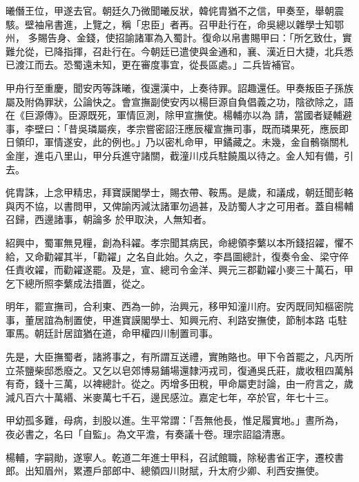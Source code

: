 \begin{pinyinscope}
 曦僭王位，甲遂去官。朝廷久乃微聞曦反狀，韓侂胄猶不之信，甲奏至，舉朝震駭。壁袖帛書進，上覽之，稱「忠臣」者再。召甲赴行在，命吳總以雜學士知鄂州，
 多賜告身、金錢，使招諭諸軍為入蜀計。復命以帛書賜甲曰：「所乞致仕，實難允從，已降指揮，召赴行在。今朝廷已遣使與金通和，襄、漢近日大捷，北兵悉已渡江而去。恐蜀遠未知，更在審度事宜，從長區處。」二兵皆補官。



 甲舟行至重慶，聞安丙等誅曦，復還漢中，上奏待罪。詔趣還任。甲奏叛臣子孫族屬及附偽罪狀，公論快之。會宣撫副使安丙以楊巨源自負倡義之功，陰欲除之，語在《巨源傳》。臣源既死，軍情叵測，除甲宣撫使。楊輔亦以為
 請，當國者疑輔避事，李壁曰：「昔吳璘屬疾，孝宗嘗密詔汪應辰權宣撫司事，既而璘果死，應辰即日領印，軍情遂安，此的例也。」乃以密札命甲，甲鐍藏之。未幾，金自鶻嶺關札金崖，進屯八里山，甲分兵進守諸關，截潼川戍兵駐饒風以待之。金人知有備，引去。



 侂胄誅，上念甲精忠，拜寶謨閣學士，賜衣帶、鞍馬。是歲，和議成，朝廷聞彭輅與丙不協，以書問甲，又俾諭丙減汰諸軍勿過甚，及訪蜀人才之可用者。蓋自楊輔召歸，西邊諸事，朝論多
 於甲取決，人無知者。



 紹興中，蜀軍無見糧，創為科糴。孝宗聞其病民，命總領李蘩以本所錢招糴，懼不給，又命勸糴其半，「勸糴」之名自此始。久之，李昌圖總計，復奏令金、梁守倅任責收糴，而勸糴遂罷。及是，宣、總司令金洋、興元三郡勸糴小麥三十萬石，甲乞下總所照李蘩成法措置，從之。



 明年，罷宣撫司，合利東、西為一帥，治興元，移甲知潼川府。安丙既同知樞密院事，董居誼為制置使，甲進寶謨閣學士、知興元府、利路安撫使，節制本路
 屯駐軍馬。朝廷計居誼猶在道，命甲權四川制置司事。



 先是，大臣撫蜀者，諸將事之，有所謂互送禮，實賄賂也。甲下令首罷之，凡丙所立茶鹽柴邸悉廢之。又乞以皂郊博易鋪場還隸沔戎司，復通吳氏莊，歲收租四萬斛有奇，錢十三萬，以裨總計。從之。丙增多田稅，甲命屬吏討論，由一府言之，歲減凡百六十萬緡、米麥萬七千石，邊民感泣。嘉定七年，卒於官，年七十三。



 甲幼孤多難，母病，刲股以進。生平常謂：「吾無他長，惟足履實地。」晝所為，
 夜必書之，名曰「自監」。為文平澹，有奏議十卷。理宗詔謚清惠。



 楊輔，字嗣勛，遂寧人。乾道二年進士甲科，召試館職，除秘書省正字，遷校書郎。出知眉州，累遷戶部郎中、總領四川財賦，升太府少卿、利西安撫使。




\end{pinyinscope}
